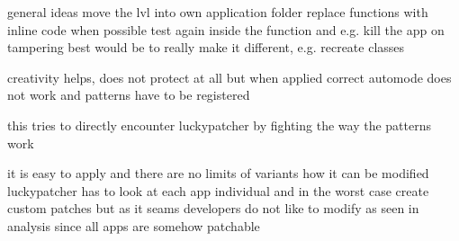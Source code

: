 general ideas
move the lvl into own application folder
replace functions with inline code when possible
test again inside the function and e.g. kill the app on tampering
best would be to really make it different, e.g. recreate classes


creativity helps, does not protect at all but when applied correct automode does not work and patterns have to be registered

this tries to directly encounter luckypatcher by fighting the way the patterns work

it is easy to apply and there are no limits of variants how it can be modified
luckypatcher has to look at each app individual and in the worst case create custom patches
but as it seams developers do not like to modify as seen in analysis since all apps are somehow patchable
